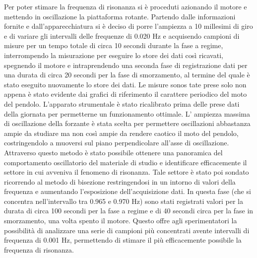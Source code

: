 Per poter stimare la frequenza di risonanza si è proceduti azionando il motore e mettendo in oscillazione la piattaforma rotante.
 Partendo dalle informazioni fornite e dall’apparecchiatura si è deciso di porre l’ampiezza a 10 millesimi di giro e di variare gli
 intervalli delle frequenze di 0.020 Hz e acquisendo campioni di misure per un tempo totale di circa 10 secondi durante la fase a
 regime, interrompendo la misurazione per eseguire lo store dei dati così ricavati, spegnendo il motore e intraprendendo una seconda
 fase di registrazione dati per una durata di circa 20 secondi per la fase di smorzamento, al termine del quale è stato  eseguito
 nuovamente lo store dei dati. Le misure sonos tate prese solo non appena è stato evidente dai grafici di riferimento il carattere
 periodico del moto del pendolo. L'apparato strumentale è stato ricalibrato prima delle prese dati della giornata per permetterne un
 funzionamento ottimale. L' ampiezza massima di oscillazione della forzante è stata scelta per permettere oscillazioni abbastanza
 ampie da studiare ma non così ampie da rendere caotico il moto del pendolo, costringendolo a muoversi sul piano perpendicolare
 all'asse di oscillazione. Attraverso questo metodo è stato possibile ottenere una panoramica del comportamento oscillatorio del materiale di studio e identificare efficacemente il settore in cui avveniva il fenomeno di risonanza. Tale settore è stato poi sondato ricorrendo al metodo di bisezione restringendosi in un intorno di valori della frequenza e aumentando l’esposizione dell’acquisizione dati. 
In questa fase (che si concentra nell’intervallo tra 0.965 e 0.970 Hz) sono stati registrati valori per la durata di circa 100
 secondi per la fase a regime e di 40 secondi circa per la fase in smorzamento, una volta spento il motore. Questo offre agli
 sperimentatori la possibilità di analizzare una serie di campioni più concentrati avente intervalli di frequenza di 0.001 Hz,
 permettendo di stimare il più efficacemente possibile la frequenza di risonanza.
